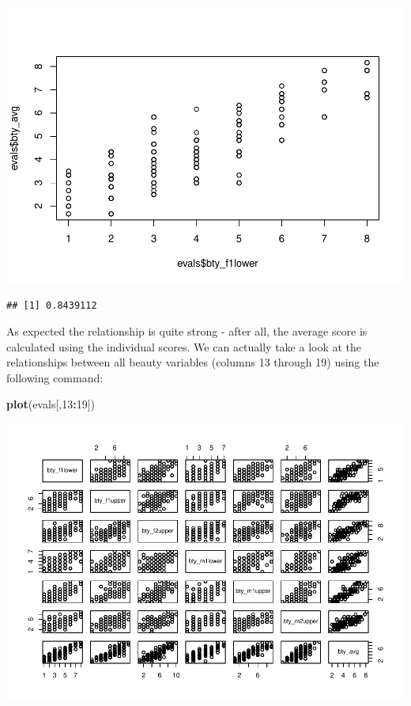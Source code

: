\documentclass[]{article}
\newenvironment{Shaded}{\begin{snugshade}}{\end{snugshade}}
\newcommand{\KeywordTok}[1]{\textcolor[rgb]{0.13,0.29,0.53}{\textbf{#1}}}
\newcommand{\DecValTok}[1]{\textcolor[rgb]{0.00,0.00,0.81}{#1}}
\newcommand{\OperatorTok}[1]{\textcolor[rgb]{0.81,0.36,0.00}{\textbf{#1}}}
\newcommand{\NormalTok}[1]{#1}
\begin{document}
\includegraphics{multiple_regression_files/figure-latex/bty-rel-1.pdf}

\begin{Shaded}
\end{Shaded}

\begin{verbatim}
## [1] 0.8439112
\end{verbatim}

As expected the relationship is quite strong - after all, the average
score is calculated using the individual scores. We can actually take a
look at the relationships between all beauty variables (columns 13
through 19) using the following command:

\begin{Shaded}
\begin{Highlighting}[]
\KeywordTok{plot}\NormalTok{(evals[,}\DecValTok{13}\OperatorTok{:}\DecValTok{19}\NormalTok{])}
\end{Highlighting}
\end{Shaded}

\includegraphics{multiple_regression_files/figure-latex/bty-rels-1.pdf}
\end{document}
